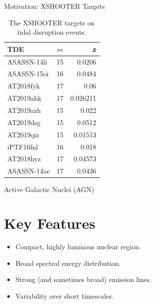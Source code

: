 \documentclass{beamer}
\begin{document}
\begin{frame}{Motivation: XSHOOTER Targets}
  \begin{table}
    \begin{tabular}{| l | c | r |}
      \hline
      TDE         & $m$ & z        \\
      \hline
      ASASSN-14li & 15  & 0.0206   \\
      ASASSN-15oi & 16  & 0.0484   \\
      AT2018fyk   & 17  & 0.06     \\
      AT2019ahk   & 17  & 0.026211 \\
      AT2019azh   & 15  & 0.022    \\
      AT2019dsg   & 15  & 0.0512   \\
      AT2019qiz   & 15  & 0.01513  \\
      iPTF16fnl   & 16  & 0.018    \\
      AT2018hyz   & 17  & 0.04573  \\
      ASASSN-14ae & 17  & 0.0436   \\
      \hline
    \end{tabular}
    \caption{The XSHOOTER targets on tidal disruption events.}
  \end{table}
\end{frame}

\begin{frame}{Active Galactic Nuclei (AGN)}
  \section{Key Features}
  \begin{itemize}
    \item Compact, highly luminous nuclear region.
    \item Broad spectral energy distribution.
    \item Strong (and sometimes broad) emission lines.
    \item Variability over short timescales.
  \end{itemize}
\end{frame}
\end{document}

